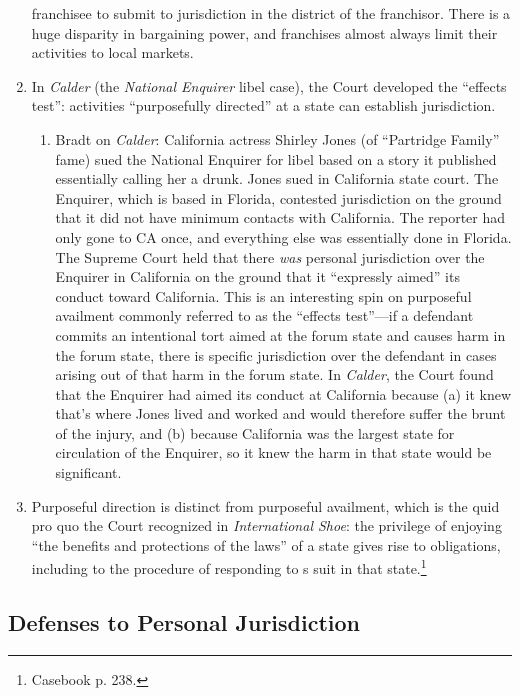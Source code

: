 \begin{enumerate}
    franchisee to submit to jurisdiction in the district of the franchisor. 
    There is a huge disparity in bargaining power, and franchises almost 
    always limit their activities to local markets.
    \item In \emph{Calder} (the \emph{National Enquirer} libel case), the 
    Court developed the ``effects test'': activities ``purposefully 
    directed'' at a state can establish jurisdiction.
    \begin{enumerate}
        \item Bradt on \emph{Calder}: 
        California actress Shirley Jones (of ``Partridge Family'' fame) sued 
        the National Enquirer for libel based on a story it published 
        essentially calling her a drunk. Jones sued in California state 
        court. The Enquirer, which is based in Florida, contested 
        jurisdiction on the ground that it did not have minimum contacts with 
        California. The reporter had only gone to CA once, and everything 
        else was essentially done in Florida. The Supreme Court held that 
        there \emph{was} personal jurisdiction over the Enquirer in California 
        on the ground that it ``expressly aimed'' its conduct toward 
        California. This is an interesting spin on purposeful availment 
        commonly referred to as the ``effects test''---if a defendant commits 
        an intentional tort aimed at the forum state and causes harm in the 
        forum state, there is specific jurisdiction over the defendant in 
        cases arising out of that harm in the forum state. In \emph{Calder}, 
        the Court found that the Enquirer had aimed its conduct at California 
        because (a) it knew that's where Jones lived and worked and would 
        therefore suffer the brunt of the injury, and (b) because California 
        was the largest state for circulation of the Enquirer, so it knew the 
        harm in that state would be significant. 
    \end{enumerate}
    \item Purposeful direction is distinct from purposeful availment, which is 
    the quid pro quo the Court recognized in \emph{International Shoe}: the 
    privilege of enjoying ``the benefits and protections of the laws'' of a 
    state gives rise to obligations, including to the procedure of responding 
    to s suit in that state.\footnote{Casebook p. 238.}
\end{enumerate}

\subsection{Defenses to Personal Jurisdiction}

